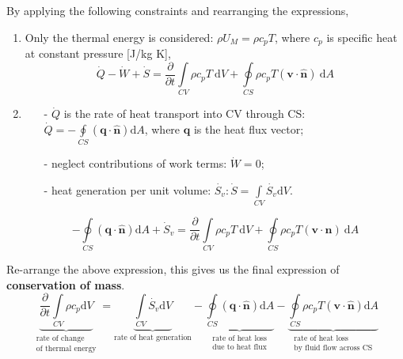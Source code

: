 \documentclass[12pt, a4paper]{article}
\begin{document}
By applying the following constraints and rearranging the expressions,
\begin{enumerate}
    \item Only the thermal energy is considered: $\rho U_{M} = \rho c_{p} T$, where $c_{p}$ is specific heat at constant pressure [J/kg K],
    \[
        \dot{Q}-\dot{W}+\dot{S} = \frac{\partial}{\partial t} \int\limits_{CV} \rho c_p T \ \mathrm{d}V +  \oint\limits_{CS} \rho c_p T (\bm{v} \cdot \bm{\hat{n}}) \ \mathrm{d}A
    \]
    
    \item \begin{itemize}
        \item[-] $\dot{Q}$ is the rate of heat transport into CV through CS: $\displaystyle \dot{Q} = -\oint\limits_{CS}(\bm{q} \cdot \bm{\hat{n}}) \mathrm{d}A$, where $\bm{q}$ is the heat flux vector;
        \item[-] neglect contributions of work terms: $\dot{W}=0$;
        \item[-] heat generation per unit volume: $\displaystyle \dot{S_{v}}: \dot{S} = \int\limits_{CV}\dot{S_{v}} \mathrm{d}V$.
    \end{itemize}
    \[
        -\oint\limits_{CS}(\bm{q} \cdot \bm{\hat{n}}) \mathrm{d}A+\dot{S}_v = \frac{\partial}{\partial t} \int\limits_{CV} \rho c_p T \ \mathrm{d}V +  \oint\limits_{CS} \rho c_p T (\bm{v} \cdot \bm{n}) \ \mathrm{d}A
    \]
\end{enumerate}

Re-arrange the above expression, this gives us the final expression of \textbf{conservation of mass}.
\begin{equation}
\label{eqn:mass_conserve}
    \boxed{ 
    \underbrace{\frac{\partial}{\partial t} \int\limits_{CV} \rho c_{p} \mathrm{d}V}_{\substack{\text{rate of change}\\\text{of thermal energy}}} 
    = \underbrace{\int\limits_{CV} \dot{S_{v}} \mathrm{d}V}_{\text{rate of heat generation}} 
    - \underbrace{\oint\limits_{CS} (\bm{q} \cdot \bm{\hat{n}}) \mathrm{d}A}_{\substack{\text{rate of heat loss}\\\text{due to heat flux}}} 
    - \underbrace{\oint\limits_{CS} \rho c_{p} T (\bm{v} \cdot \bm{\hat{n}}) \mathrm{d}A}_{\substack{\text{rate of heat loss}\\ \text{by fluid flow across CS}}} 
}
\end{equation}
\end{document}
